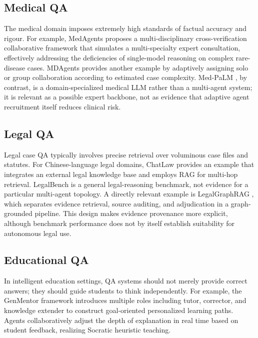 \documentclass[a4paper,fleqn]{cas-dc}
\begin{document}
\subsection{Medical QA}
\label{sec:medical}

The medical domain imposes extremely high standards of factual accuracy
and rigour.
For example, MedAgents \citep{tang2024medagents} proposes a multi-disciplinary
cross-verification collaborative framework that simulates a multi-specialty
expert consultation, effectively addressing the deficiencies of single-model
reasoning on complex rare-disease cases.
MDAgents \citep{kim2024mdagents} provides another example by adaptively assigning solo or group
collaboration according to estimated case complexity. Med-PaLM
\citep{singhal2023medpalm}, by contrast, is a domain-specialized medical LLM
rather than a multi-agent system; it is relevant as a possible expert backbone,
not as evidence that adaptive agent recruitment itself reduces clinical risk.

\subsection{Legal QA}
\label{sec:legal}

Legal case QA typically involves precise retrieval over voluminous case
files and statutes.
For Chinese-language legal domains, ChatLaw \citep{cui2023chatlaw} provides an example that
integrates an external legal knowledge base and employs RAG for multi-hop
retrieval.
LegalBench \citep{guha2023legalbench} is a general legal-reasoning benchmark,
not evidence for a particular multi-agent topology. A directly relevant
example is LegalGraphRAG \citep{legalgraphrag2026}, which separates evidence
retrieval, source auditing, and adjudication in a graph-grounded pipeline.
This design makes evidence provenance more explicit, although benchmark
performance does not by itself establish suitability for autonomous legal use.

\subsection{Educational QA}
\label{sec:education}

In intelligent education settings, QA systems should not merely provide
correct answers; they should guide students to think independently.
For example, the GenMentor framework \citep{li2024genmentor} introduces multiple roles
including tutor, corrector, and knowledge extender to construct
goal-oriented personalized learning paths.
Agents collaboratively adjust the depth of explanation in real time
based on student feedback, realizing Socratic heuristic teaching.
\end{document}
